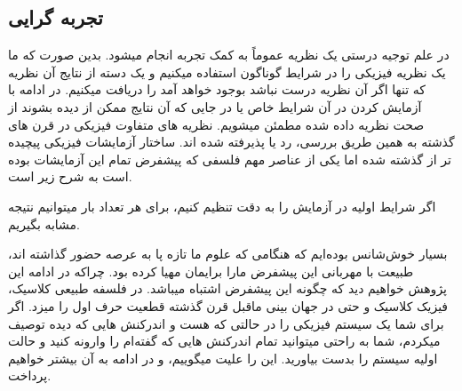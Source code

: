 \documentclass[9pt, twocolumn]{article}
\begin{document}
        \subsection{تجربه گرایی}
            در علم توجیه درستی یک نظریه عموماً به کمک تجربه انجام میشود. بدین صورت که ما یک نظریه فیزیکی را در شرایط گوناگون استفاده میکنیم و یک دسته از نتایج آن نظریه که تنها اگر آن نظریه درست نباشد بوجود خواهد آمد را دریافت میکنیم. در ادامه با آزمایش کردن در آن شرایط خاص یا در جایی که آن نتایج ممکن از دیده بشوند از صحت نظریه داده شده مطمئن میشویم. نظریه های متفاوت فیزیکی در قرن های گذشته به همین طریق بررسی، رد یا پذیرفته شده اند. ساختار آزمایشات فیزیکی پیچیده تر از گذشته شده اما یکی از عناصر مهم فلسفی که پیشفرض تمام این آزمایشات بوده است به شرح زیر است.
            \begin{qt}
                اگر شرایط اولیه در آزمایش را به دقت تنظیم کنیم، برای هر تعداد بار میتوانیم نتیجه مشابه بگیریم.
            \end{qt}
            بسیار خوش‌شانس بوده‌ایم که هنگامی که علوم ما تازه پا به عرصه حضور گذاشته اند، طبیعت با مهربانی این پیشفرض مارا برایمان مهیا کرده بود. چراکه در ادامه این پژوهش خواهیم دید که چگونه این پیشفرض اشتباه میباشد. در فلسفه طبیعی کلاسیک، فیزیک کلاسیک و حتی در جهان بینی ماقبل قرن گذشته قطعیت حرف اول را میزد. اگر برای شما یک سیستم فیزیکی را در حالتی که هست و اندرکنش هایی که دیده توصیف میکردم، شما به راحتی میتوانید تمام اندرکنش هایی که گفته‌ام را وارونه کنید و حالت اولیه سیستم را بدست بیاورید. این را علیت میگوییم، و در ادامه به آن بیشتر خواهیم پرداخت.
\end{document}

